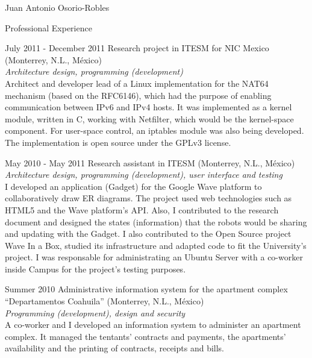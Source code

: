 \documentclass[spanish,10pt,letterpaper]{article}
\begin{document}
\begin{cv}{Juan Antonio Osorio-Robles}
	\begin{cvlist}{Professional Experience}
		\item [July 2011 - December 2011]
			Research project in ITESM for NIC Mexico (Monterrey, N.L., M\'{e}xico)
			\\ \emph{Architecture design, programming (development)}
			\\ Architect and developer lead of a Linux implementation for the NAT64 mechanism (based on the RFC6146), which had the purpose of enabling communication between IPv6 and IPv4 hosts. It was implemented as a kernel module, written in C, working with Netfilter, which would be the kernel-space component. For user-space control, an iptables module was also being developed. The implementation is open source under the GPLv3 license.
		\item [May 2010 - May 2011]
			Research assistant in ITESM (Monterrey, N.L., M\'{e}xico)
			\\ \emph{Architecture design, programming (development), user interface and testing}
			\\ I developed an application (Gadget) for the Google Wave platform to collaboratively draw ER diagrams. The project used web technologies such as HTML5 and the Wave platform's API. Also, I contributed to the research document and designed the states (information) that the robots would be sharing and updating with the Gadget. I also contributed to the Open Source project Wave In a Box, studied its infrastructure and adapted code to fit the University's project. I was responsable for administrating an Ubuntu Server with a co-worker inside Campus for the project's testing purposes.
		\item [Summer 2010]
			Administrative information system for the apartment complex ``Departamentos Coahuila'' (Monterrey, N.L., M\'{e}xico)
			\\ \emph{Programming (development), design and security}
			\\ A co-worker and I developed an information system to administer an apartment complex. It managed the tentants' contracts and payments, the apartments' availability and the printing of contracts, receipts and bills.

	\end{cvlist}


\end{cv}
\end{document}
